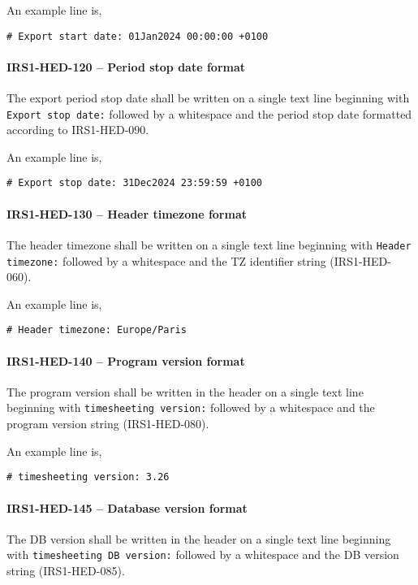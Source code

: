 An example line is,
\begin{lstlisting}[numbers=none]
  # Export start date: 01Jan2024 00:00:00 +0100
\end{lstlisting}

\paragraph{IRS1-HED-120 -- Period stop date format}
The export period stop date shall be written on a single text line beginning
with \lstinline{Export stop date:} followed by a whitespace and the period
stop date formatted according to IRS1-HED-090.

An example line is,
\begin{lstlisting}[numbers=none]
  # Export stop date: 31Dec2024 23:59:59 +0100
\end{lstlisting}

\paragraph{IRS1-HED-130 -- Header timezone format}
The header timezone shall be written on a single text line
beginning with \lstinline{Header timezone:} followed by a whitespace
and the TZ identifier string (IRS1-HED-060).

An example line is,
\begin{lstlisting}[numbers=none]
  # Header timezone: Europe/Paris
\end{lstlisting}

\paragraph{IRS1-HED-140 -- Program version format}
The program version shall be written in the header on a single text line
beginning with \lstinline{timesheeting version:} followed by a whitespace
and the program version string (IRS1-HED-080).

An example line is,
\begin{lstlisting}[numbers=none]
  # timesheeting version: 3.26
\end{lstlisting}

\paragraph{IRS1-HED-145 -- Database version format}
The \gls{DB} version shall be written in the header on a single text line
beginning with \lstinline{timesheeting DB version:} followed by a whitespace
and the \gls{DB} version string (IRS1-HED-085).

